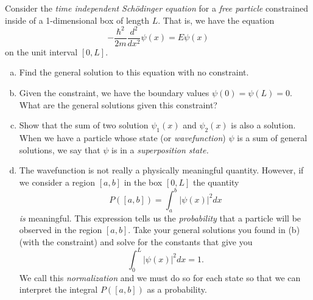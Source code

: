 \documentclass[12pt]{article} %
\begin{document}
\begin{problem}
Consider the \emph{time independent Sch\"odinger equation} for a \emph{free particle} constrained inside of a 1-dimensional box of length $L$. That is, we have the equation
\[
-\frac{\hbar^2}{2m}\frac{d^2}{dx^2}\psi(x)=E\psi(x)
\]
on the unit interval $[0,L]$.
\begin{enumerate}[(a)]
    \item Find the general solution to this equation with no constraint.
    \item Given the constraint, we have the boundary values $\psi(0)=\psi(L)=0$. What are the general solutions given this constraint?
    \item Show that the sum of two solution $\psi_1(x)$ and $\psi_2(x)$ is also a solution. When we have a particle whose state (or \emph{wavefunction}) $\psi$ is a sum of general solutions, we say that $\psi$ is in a \emph{superposition state.}
    \item The wavefunction is not really a physically meaningful quantity.  However, if we consider a region $[a,b]$ in the box $[0,L]$ the quantity
    \[
    P([a,b])=\int_a^b |\psi(x)|^2dx
    \]
    \emph{is} meaningful. This expression tells us the \emph{probability} that a particle will be observed in the region $[a,b]$.  Take your general solutions you found in (b) (with the constraint) and solve for the constants that give you
    \[
    \int_0^L |\psi(x)|^2dx=1.
    \]
    We call this \emph{normalization} and we must do so for each state so that we can interpret the integral $P([a,b])$ as a probability.
\end{enumerate}
\end{problem}
\end{document}
